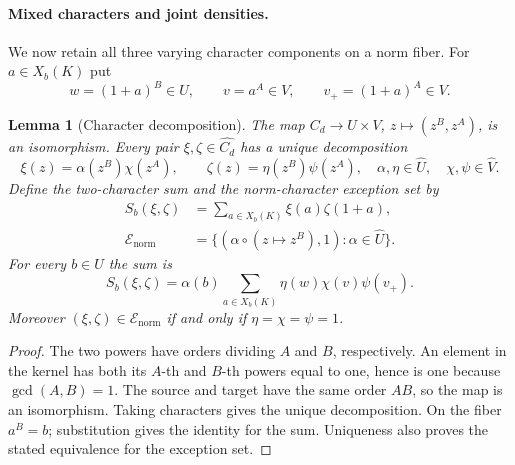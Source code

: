 \documentclass[11pt]{article}
\newtheorem*{auxlemma}{Lemma}
\begin{document}
\paragraph{Mixed characters and joint densities.}
We now retain all three varying character components on a norm fiber.
For $a\in X_b(K)$ put
\begin{equation}\label{eq:inner-mixed-variables}
 w=(1+a)^B\in U,\qquad v=a^A\in V,\qquad v_+=(1+a)^A\in V.
\end{equation}
\begin{auxlemma}[Character decomposition]
The map $C_d\longrightarrow U\times V$, $z\mapsto(z^B,z^A)$,
is an isomorphism. Every pair $\xi,\zeta\in\widehat{C_d}$ has a
unique decomposition
\[
 \xi(z)=\alpha(z^B)\chi(z^A),\qquad
 \zeta(z)=\eta(z^B)\psi(z^A),
 \quad \alpha,\eta\in\widehat U,\quad\chi,\psi\in\widehat V.
\]
Define the two-character sum and the norm-character exception set by
\begin{equation}\label{eq:inner-pair-sum}
 \begin{aligned}
 S_b(\xi,\zeta)&=\sum_{a\in X_b(K)}\xi(a)\zeta(1+a),\\
 \mathcal E_{\mathrm{norm}}
 &=\{(\alpha\circ(z\mapsto z^B),1):\alpha\in\widehat U\}.
 \end{aligned}
\end{equation}
For every $b\in U$ the sum is
\[
 S_b(\xi,\zeta)=\alpha(b)
       \sum_{a\in X_b(K)}\eta(w)\chi(v)\psi(v_+).
\]
Moreover $(\xi,\zeta)\in\mathcal E_{\mathrm{norm}}$ if and only if
$\eta=\chi=\psi=1$.
\end{auxlemma}
\begin{proof}
The two powers have orders dividing $A$ and $B$, respectively.
An element in the kernel has both its $A$-th and $B$-th powers equal
to one, hence is one because $\gcd(A,B)=1$.
The source and target have the same order $AB$, so the map is an
isomorphism. Taking characters gives the unique decomposition.
On the fiber $a^B=b$; substitution gives the identity for the sum.
Uniqueness also proves the stated equivalence for the exception set.
\end{proof}
\end{document}
